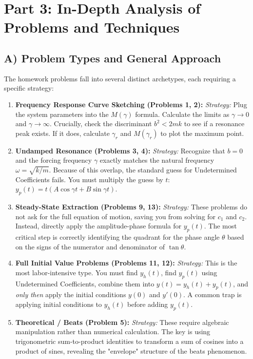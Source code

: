 \documentclass[11pt]{article}
\begin{document}
\newpage
\section{Part 3: In-Depth Analysis of Problems and Techniques}

\subsection{A) Problem Types and General Approach}
The homework problems fall into several distinct archetypes, each requiring a specific strategy:

\begin{enumerate}
    \item \textbf{Frequency Response Curve Sketching (Problems 1, 2):}
    \textit{Strategy:} Plug the system parameters into the $M(\gamma)$ formula. Calculate the limits as $\gamma \to 0$ and $\gamma \to \infty$. Crucially, check the discriminant $b^2 < 2mk$ to see if a resonance peak exists. If it does, calculate $\gamma_r$ and $M(\gamma_r)$ to plot the maximum point.
    
    \item \textbf{Undamped Resonance (Problems 3, 4):}
    \textit{Strategy:} Recognize that $b=0$ and the forcing frequency $\gamma$ exactly matches the natural frequency $\omega = \sqrt{k/m}$. Because of this overlap, the standard guess for Undetermined Coefficients fails. You must multiply the guess by $t$: $y_p(t) = t(A \cos \gamma t + B \sin \gamma t)$.
    
    \item \textbf{Steady-State Extraction (Problems 9, 13):}
    \textit{Strategy:} These problems do not ask for the full equation of motion, saving you from solving for $c_1$ and $c_2$. Instead, directly apply the amplitude-phase formula for $y_p(t)$. The most critical step is correctly identifying the quadrant for the phase angle $\theta$ based on the signs of the numerator and denominator of $\tan \theta$.
    
    \item \textbf{Full Initial Value Problems (Problems 11, 12):}
    \textit{Strategy:} This is the most labor-intensive type. You must find $y_h(t)$, find $y_p(t)$ using Undetermined Coefficients, combine them into $y(t) = y_h(t) + y_p(t)$, and \textit{only then} apply the initial conditions $y(0)$ and $y'(0)$. A common trap is applying initial conditions to $y_h(t)$ before adding $y_p(t)$.
    
    \item \textbf{Theoretical / Beats (Problem 5):}
    \textit{Strategy:} These require algebraic manipulation rather than numerical calculation. The key is using trigonometric sum-to-product identities to transform a sum of cosines into a product of sines, revealing the "envelope" structure of the beats phenomenon.
\end{enumerate}
\end{document}
